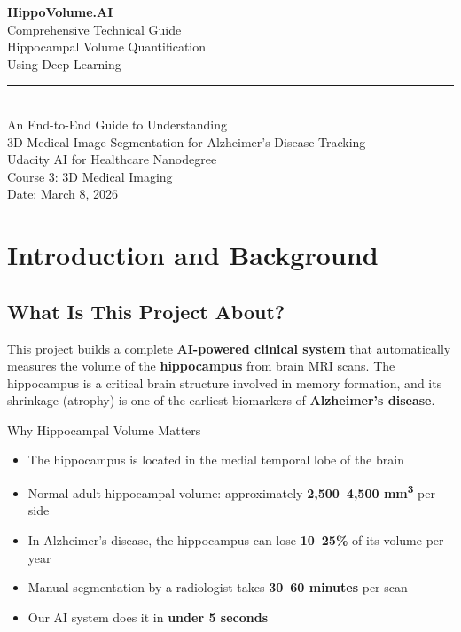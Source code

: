 \documentclass[12pt,a4paper]{report}
\begin{document}
\begin{titlepage}
\centering
\vspace*{2cm}
{\Huge\bfseries HippoVolume.AI\\[0.5cm]}
{\LARGE Comprehensive Technical Guide\\[0.3cm]}
{\Large Hippocampal Volume Quantification\\Using Deep Learning\\[2cm]}
\rule{\textwidth}{1pt}\\[1cm]
{\large An End-to-End Guide to Understanding\\
3D Medical Image Segmentation for Alzheimer's Disease Tracking\\[2cm]}
{\large Udacity AI for Healthcare Nanodegree\\
Course 3: 3D Medical Imaging\\[1cm]}
{\large Date: March 8, 2026}
\vfill
\end{titlepage}

\tableofcontents
\newpage

\chapter{Introduction and Background}

\section{What Is This Project About?}

This project builds a complete \textbf{AI-powered clinical system} that automatically measures the volume of the \textbf{hippocampus} from brain MRI scans. The hippocampus is a critical brain structure involved in memory formation, and its shrinkage (atrophy) is one of the earliest biomarkers of \textbf{Alzheimer's disease}.

\begin{conceptbox}{Why Hippocampal Volume Matters}
\begin{itemize}
    \item The hippocampus is located in the medial temporal lobe of the brain
    \item Normal adult hippocampal volume: approximately \textbf{2,500--4,500 mm\textsuperscript{3}} per side
    \item In Alzheimer's disease, the hippocampus can lose \textbf{10--25\%} of its volume per year
    \item Manual segmentation by a radiologist takes \textbf{30--60 minutes} per scan
    \item Our AI system does it in \textbf{under 5 seconds}
\end{itemize}
\end{conceptbox}
\end{document}

